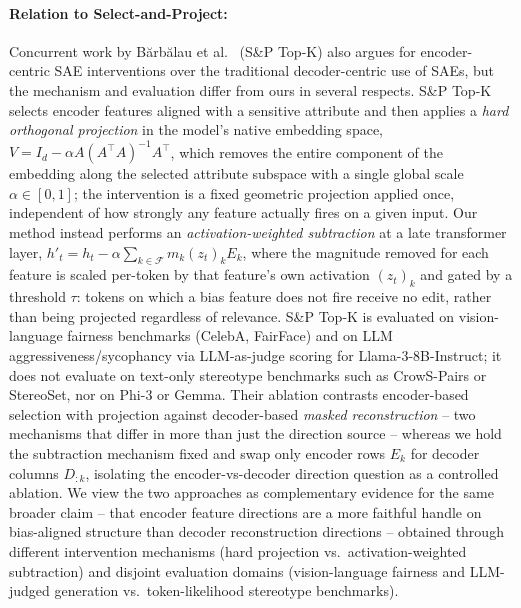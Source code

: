 \paragraph{Relation to Select-and-Project:} Concurrent work by B\u{a}rb\u{a}lau et al.\ \cite{ref_sp} (S\&P Top-K) also argues for encoder-centric SAE interventions over the traditional decoder-centric use of SAEs, but the mechanism and evaluation differ from ours in several respects. S\&P Top-K selects encoder features aligned with a sensitive attribute and then applies a \emph{hard orthogonal projection} in the model's native embedding space, $V = I_d - \alpha A(A^\top A)^{-1}A^\top$, which removes the entire component of the embedding along the selected attribute subspace with a single global scale $\alpha \in [0,1]$; the intervention is a fixed geometric projection applied once, independent of how strongly any feature actually fires on a given input. Our method instead performs an \emph{activation-weighted subtraction} at a late transformer layer, $h'_t = h_t - \alpha\sum_{k\in\mathcal{F}} m_k (z_t)_k E_k$, where the magnitude removed for each feature is scaled per-token by that feature's own activation $(z_t)_k$ and gated by a threshold $\tau$: tokens on which a bias feature does not fire receive no edit, rather than being projected regardless of relevance. S\&P Top-K is evaluated on vision-language fairness benchmarks (CelebA, FairFace) and on LLM aggressiveness/sycophancy via LLM-as-judge scoring for Llama-3-8B-Instruct; it does not evaluate on text-only stereotype benchmarks such as CrowS-Pairs or StereoSet, nor on Phi-3 or Gemma. Their ablation contrasts encoder-based selection with projection against decoder-based \emph{masked reconstruction} -- two mechanisms that differ in more than just the direction source -- whereas we hold the subtraction mechanism fixed and swap only encoder rows $E_k$ for decoder columns $D_{:k}$, isolating the encoder-vs-decoder direction question as a controlled ablation. We view the two approaches as complementary evidence for the same broader claim -- that encoder feature directions are a more faithful handle on bias-aligned structure than decoder reconstruction directions -- obtained through different intervention mechanisms (hard projection vs.\ activation-weighted subtraction) and disjoint evaluation domains (vision-language fairness and LLM-judged generation vs.\ token-likelihood stereotype benchmarks).

